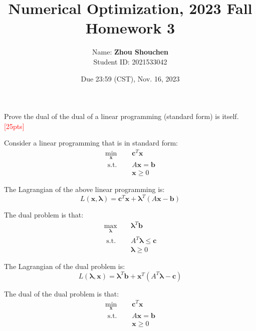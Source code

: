 \documentclass[10pt]{article}
\newenvironment{problem}[2][Problem]{\begin{trivlist}
\item[\hskip \labelsep {\bfseries #1}\hskip \labelsep {\bfseries #2.}]}{\end{trivlist}}
\begin{document}
\title{	Numerical Optimization, 2023 Fall\\Homework 3}
\date{Due 23:59 (CST), Nov. 16, 2023 }

\author{
    Name: \textbf{Zhou Shouchen} \\
	Student ID: 2021533042
}

\maketitle
\newpage


\begin{problem}{1}
    Prove the dual of the dual of a linear programming (standard form) is itself.\textcolor{red}{[25pts]}
\end{problem}

Consider a linear programming that is in standard form:\\
\begin{equation}
\begin{aligned}
\min_{\bm{x}} \quad & \bm{c}^T\bm{x} \\
\text { s.t. } \quad & A\bm{x} = \bm{b} \\
& \bm{x} \geq 0
\end{aligned}
\end{equation}

The Lagrangian of the above linear programming is:\\
\begin{equation}
L(\bm{x},\bm{\lambda}) = \bm{c}^T\bm{x} + \bm{\lambda}^T(A\bm{x} - \bm{b})
\end{equation}

The dual problem is that:\\
\begin{equation}
\begin{aligned}
\max_{\bm{\lambda}} \quad & \bm{\lambda}^T\bm{b} \\
\text { s.t. } \quad & A^T\bm{\lambda} \leq \bm{c} \\
& \bm{\lambda} \geq 0
\end{aligned}
\end{equation}

The Lagrangian of the dual problem is:\\
\begin{equation}
L(\bm{\lambda},\bm{x}) = \bm{\lambda}^T\bm{b} + \bm{x}^T(A^T\bm{\lambda} - \bm{c})
\end{equation}

The dual of the dual problem is that:\\
\begin{equation}
\begin{aligned}
\min_{\bm{x}} \quad & \bm{c}^T\bm{x} \\
\text { s.t. } \quad & A\bm{x} = \bm{b} \\
& \bm{x} \geq 0
\end{aligned}
\end{equation}
\end{document}
